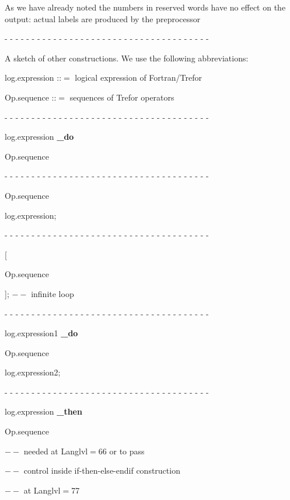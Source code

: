 \par\noindent As we have already noted the numbers in reserved
words have no effect on the output: actual
  labels are produced by the preprocessor

- - - - - - - - - - - - - - - - - - - - - - - - - - - - - - - - - - - - - -


\qquad A sketch of other constructions. We use the following
abbreviations:

\qquad log.expression \quad ::$=$ logical expression of Fortran/Trefor

\qquad Op.sequence  \qquad ::$=$ sequences of Trefor operators

- - - - - - - - - - - - - - - - - - - - - - - - - - - - - - - - - - - - - -

 log.expression {\bf \_do}

 \qquad \qquad      Op.sequence


- - - - - - - - - - - - - - - - - - - - - - - - - - - - - - - - - - - - - -


\qquad \qquad   Op.sequence

 log.expression;

- - - - - - - - - - - - - - - - - - - - - - - - - - - - - - - - - - - - - -

[

\qquad \qquad   Op.sequence

\qquad \qquad \qquad ];   \qquad   $--$ infinite loop

- - - - - - - - - - - - - - - - - - - - - - - - - - - - - - - - - - - - - -

 log.expression1 {\bf \_do}

\qquad \qquad  Op.sequence

 log.expression2;

- - - - - - - - - - - - - - - - - - - - - - - - - - - - - - - - - - - - - -

 log.expression {\bf \_then}

\qquad \qquad  Op.sequence

  \qquad  $--$ needed at Langlvl$=$66 or to pass

\hskip 5cm    $--$ control inside if-then-else-endif construction

\hskip 5cm   $--$ at Langlvl$=$77

